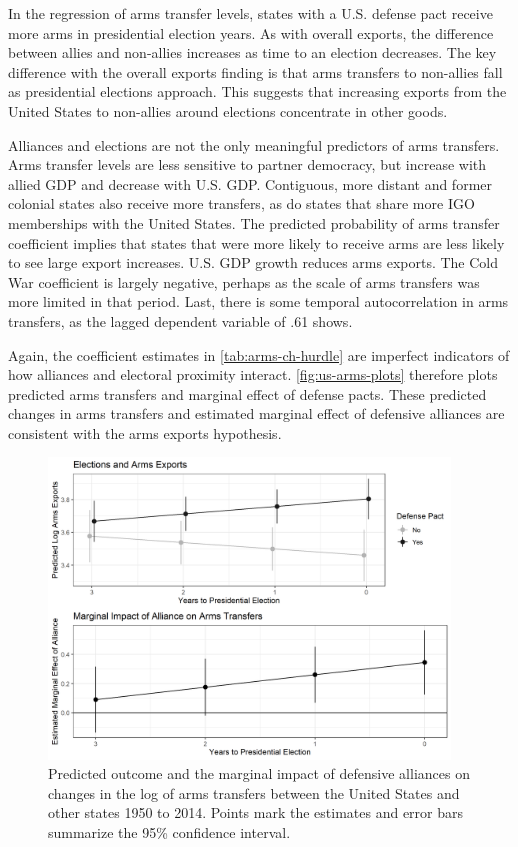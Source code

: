 \documentclass[12pt]{article}
\begin{document}
In the regression of arms transfer levels, states with a U.S. defense pact receive more arms in presidential election years. 
As with overall exports, the difference between allies and non-allies increases as time to an election decreases.
The key difference with the overall exports finding is that arms transfers to non-allies fall as presidential elections approach. 
This suggests that increasing exports from the United States to non-allies around elections concentrate in other goods. 


Alliances and elections are not the only meaningful predictors of arms transfers.
Arms transfer levels are less sensitive to partner democracy, but increase with allied GDP and decrease with U.S. GDP. 
Contiguous, more distant and former colonial states also receive more transfers, as do states that share more IGO memberships with the United States.
The predicted probability of arms transfer coefficient implies that states that were more likely to receive arms are less likely to see large export increases.  
U.S. GDP growth reduces arms exports. 
The Cold War coefficient is largely negative, perhaps as the scale of arms transfers was more limited in that period. 
Last, there is some temporal autocorrelation in arms transfers, as the lagged dependent variable of .61 shows.


Again, the coefficient estimates in \autoref{tab:arms-ch-hurdle} are imperfect indicators of how alliances and electoral proximity interact.
\autoref{fig:us-arms-plots} therefore plots predicted arms transfers and marginal effect of defense pacts.
These predicted changes in arms transfers and estimated marginal effect of defensive alliances are consistent with the arms exports hypothesis.


\begin{figure}[htpb]
	\centering
		\includegraphics[width=0.95\textwidth]{../figures/us-arms-plots.png}
	\caption{Predicted outcome and the marginal impact of defensive alliances on changes in the log of arms transfers between the United States and other states 1950 to 2014. Points mark the estimates and error bars summarize the 95\% confidence interval.}
	\label{fig:us-arms-plots}
\end{figure}
\end{document}
